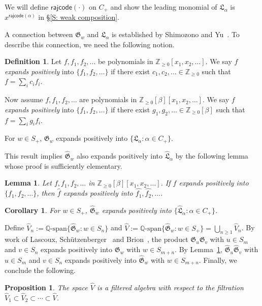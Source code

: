 \documentclass[10pt]{amsart}
\theoremstyle{plain}
\newtheorem{cor}[cor]{Corollary}
\theoremstyle{plain}
\theoremstyle{definition}
\theoremstyle{definition}
\newtheorem{defn}[defn]{Definition}
\theoremstyle{definition}
\theoremstyle{plain}
\theoremstyle{plain}
\theoremstyle{plain}
\newtheorem{lemma}[lemma]{Lemma}
\theoremstyle{plain}
\newtheorem{prop}[prop]{Proposition}
\theoremstyle{plain}
\theoremstyle{remark}
\theoremstyle{remark}
\theoremstyle{plain}
\theoremstyle{plain}
\newcommand{\fG}{\mathfrak{G}}
\newcommand{\fGb}{\fG}
\newcommand{\fL}{\mathfrak{L}}
\newcommand{\fLb}{\fL}
\newcommand{\topLas}{\widehat{\fL}}
\newcommand{\topGro}{\widehat{\fG}}
\newcommand{\Q}{\mathbb{Q}}
\newcommand{\rajcode}{\mathsf{rajcode}}
\newcommand{\definition}[1]{{\color{darkred}\emph{#1}}}
\begin{document}
We will define $\rajcode(\cdot)$ on $C_+$
and show the leading monomial of $\fLb_\alpha$ is $x^{\rajcode(\alpha)}$
in \S\ref{S: weak composition}.

A connection between $\fGb_w$ and $\fLb_\alpha$
is established by Shimozono and Yu~\cite{SY}.
To describe this connection, 
we need the following notion.
\begin{defn}
Let $f, f_1, f_2, \dots$ be polynomials in 
$\mathbb{Z}_{\geq 0}[x_1, x_2,\dots]$.
We say $f$ \definition{expands positively} 
into $\{f_1,f_2, \dots\}$ if there exist 
$c_1,c_2, \dots \in \mathbb{Z}_{\geq 0}$
such that $f = \sum_{i} c_if_i$.

Now assume $f, f_1, f_2, \dots$ are polynomials 
in $\mathbb{Z}_{ \geq 0}[\beta][x_1, x_2,\dots]$.
We say $f$ \definition{expands positively} 
into $\{f_1,f_2, \dots\}$ if there exist 
$g_1,g_2, \dots \in \mathbb{Z}_{\geq 0}[\beta]$ 
such that $f = \sum_{i} g_if_i$.
\end{defn}

\begin{ourthm}[\cite{SY}]
\label{T: Gro to Las}
For $w \in S_+$, $\fGb_w$ expands positively
into $\{\fLb_\alpha: \alpha \in C_+\}$. 
\end{ourthm}
 
This result implies
$\topGro_w$ also expands
positively into
$\topLas_\alpha$ by the following lemma whose proof
is sufficiently elementary. 

\begin{lemma}
\label{L: Expands positively}
Let $f, f_1, f_2, \dots$ 
in $\mathbb{Z}_{\geq 0}[\beta][x_1, x_2,\dots]$.
If $f$ expands positively 
into $\{f_1, f_2, \dots\}$,
then $\widehat{f}$ expands positively into $\widehat{f_1}, \widehat{f_2}, \dots $.
\end{lemma}

\begin{cor}
\label{C: top Gro to top Las}
For $w \in S_+$,
$\topGro_w$ expands positively into $\{\topLas_\alpha: \alpha \in C_+\}$.
\end{cor}

Define $\widehat{V}_n :=  \Q\textrm{-span}\{\topGro_w: w \in S_n\}$ and $\widehat{V} :=  \Q\textrm{-span}\{\topGro_w: w \in S_+\} = \bigcup_{n \geq 1} \widehat{V}_n$.
By work of Lascoux, Sch{\"u}tzenberger~\cite{LS:Groth} and Brion~\cite{Bri},
the product $\fGb_u \fGb_v$ with $u \in S_m$ and $v \in S_n$
expands positively into $\fGb_w$ with $w \in S_{m + n}$.
By Lemma~\ref{L: Expands positively},
$\topGro_u \topGro_v$ with $u \in S_m$ and $v \in S_n$ expands positively into $\topGro_w$ 
with $w \in S_{m + n}$.
Finally, we conclude the following.
\begin{prop}
\label{P: Filtered Algebra}
The space $\widehat{V}$ is a filtered 
algebra with respect to the filtration
$\widehat{V}_1 \subset \widehat{V}_2 \subset \cdots \subset \widehat{V}$.
\end{prop}
\end{document}
